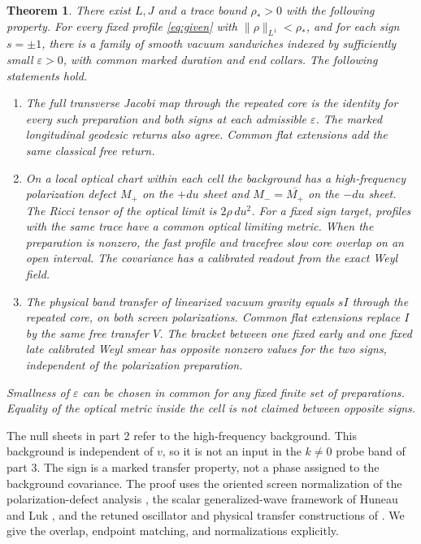 \documentclass[11pt]{article}
\newtheorem{theorem}{Theorem}
\begin{document}
\begin{theorem}\label{thm:main}
There exist \(L,J\) and a trace bound \(\rho_*>0\) with the following property. For every fixed profile \eqref{eq:given} with \(\|\rho\|_{L^1}<\rho_*\), and for each sign \(s=\pm1\), there is a family of smooth vacuum sandwiches indexed by sufficiently small \(\varepsilon>0\), with common marked duration and end collars. The following statements hold.
\begin{enumerate}
\item The full transverse Jacobi map through the repeated core is the identity for every such preparation and both signs at each admissible \(\varepsilon\). The marked longitudinal geodesic returns also agree. Common flat extensions add the same classical free return.
\item On a local optical chart within each cell the background has a high-frequency polarization defect \(M_+\) on the \(+du\) sheet and \(M_-=\overline{M_+}\) on the \(-du\) sheet. The Ricci tensor of the optical limit is \(2\rho\,du^2\). For a fixed sign target, profiles with the same trace have a common optical limiting metric. When the preparation is nonzero, the fast profile and tracefree slow core overlap on an open interval. The covariance has a calibrated readout from the exact Weyl field.
\item The physical band transfer of linearized vacuum gravity equals \(sI\) through the repeated core, on both screen polarizations. Common flat extensions replace \(I\) by the same free transfer \(V\). The bracket between one fixed early and one fixed late calibrated Weyl smear has opposite nonzero values for the two signs, independent of the polarization preparation.
\end{enumerate}
Smallness of \(\varepsilon\) can be chosen in common for any fixed finite set of preparations. Equality of the optical metric inside the cell is not claimed between opposite signs.
\end{theorem}

The null sheets in part 2 refer to the high-frequency background. This background is independent of \(v\), so it is not an input in the \(k\ne0\) probe band of part 3. The sign is a marked transfer property, not a phase assigned to the background covariance. The proof uses the oriented screen normalization of the polarization-defect analysis \cite{p29b}, the scalar generalized-wave framework of Huneau and Luk \cite{hl}, and the retuned oscillator and physical transfer constructions of \cite{p31}. We give the overlap, endpoint matching, and normalizations explicitly.
\end{document}
